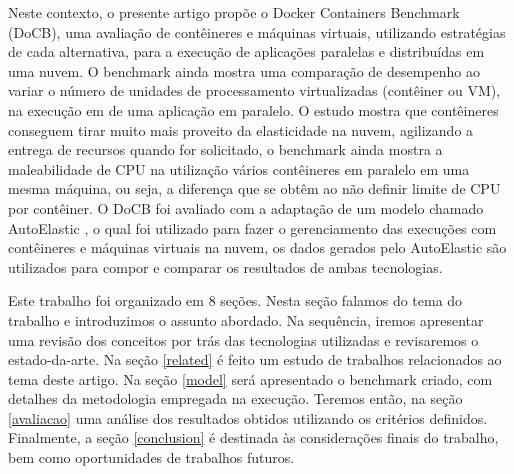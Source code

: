 \documentclass[twoside,english,brazilian]{UNISINOSartigo}
\begin{document}

Neste contexto, o presente artigo propõe o Docker Containers Benchmark (DoCB), uma avaliação de contêineres e máquinas virtuais, utilizando estratégias de cada alternativa, para a execução de aplicações paralelas e distribuídas em uma nuvem. O benchmark ainda mostra uma comparação de desempenho ao variar o número de unidades de processamento virtualizadas (contêiner ou VM), na execução em de uma aplicação em paralelo. O estudo mostra que contêineres conseguem tirar muito mais proveito da elasticidade na nuvem, agilizando a entrega de recursos quando for solicitado, o benchmark ainda mostra a maleabilidade de CPU na utilização vários contêineres em paralelo em uma mesma máquina, ou seja, a diferença que se obtêm ao não definir limite de CPU por contêiner. O DoCB foi avaliado com a adaptação de um modelo chamado AutoElastic , o qual foi utilizado para fazer o gerenciamento das execuções com contêineres e máquinas virtuais na nuvem, os dados gerados pelo AutoElastic são utilizados para compor e comparar os resultados de ambas tecnologias. 

Este trabalho foi organizado em 8 seções. Nesta seção falamos do tema do trabalho e introduzimos o assunto abordado. Na sequência, iremos apresentar uma revisão dos conceitos por trás das tecnologias utilizadas e revisaremos o estado-da-arte. Na seção \ref{related} é feito um estudo de trabalhos relacionados ao tema deste artigo. Na seção \ref{model} será apresentado o benchmark criado, com detalhes da metodologia empregada na execução. Teremos então, na seção \ref{avaliacao} uma análise dos resultados obtidos utilizando os critérios definidos. Finalmente, a seção \ref{conclusion} é destinada às considerações finais do trabalho, bem como oportunidades de trabalhos futuros.
\end{document}
